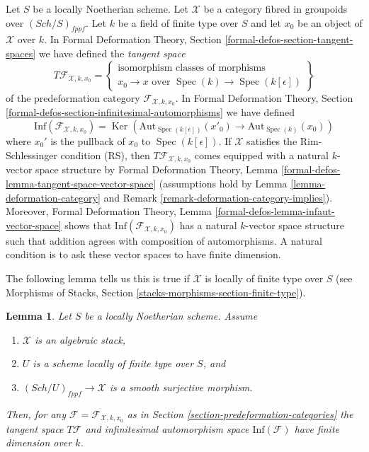\documentclass{stacks-project}
\theoremstyle{plain}
\newtheorem{lemma}[subsection]{Lemma}
\theoremstyle{definition}
\theoremstyle{remark}
\numberwithin{equation}{subsection}
\def\Spec{\mathop{\mathrm{Spec}}}
\def\Sch{\mathit{Sch}}
\def\Ker{\mathop{\mathrm{Ker}}}
\begin{document}
\noindent
Let $S$ be a locally Noetherian scheme. Let $\mathcal{X}$ be a category
fibred in groupoids over $(\Sch/S)_{fppf}$. Let $k$ be a field of finite
type over $S$ and let $x_0$ be an object of $\mathcal{X}$ over $k$.
In Formal Deformation Theory, Section \ref{formal-defos-section-tangent-spaces}
we have defined the {\it tangent space}
\begin{equation}
\label{equation-tangent-space}
T\mathcal{F}_{\mathcal{X}, k, x_0} =
\left\{
\begin{matrix}
\text{isomorphism classes of morphisms}\\
x_0 \to x\text{ over }\Spec(k) \to \Spec(k[\epsilon])
\end{matrix}
\right\}
\end{equation}
of the predeformation category $\mathcal{F}_{\mathcal{X}, k, x_0}$.
In Formal Deformation Theory, Section
\ref{formal-defos-section-infinitesimal-automorphisms}
we have defined
\begin{equation}
\label{equation-infinitesimal-automorphisms}
\text{Inf}(\mathcal{F}_{\mathcal{X}, k, x_0}) =
\Ker\left(
\text{Aut}_{\Spec(k[\epsilon])}(x'_0) \to \text{Aut}_{\Spec(k)}(x_0)
\right)
\end{equation}
where $x_0'$ is the pullback of $x_0$ to $\Spec(k[\epsilon])$.
If $\mathcal{X}$ satisfies the Rim-Schlessinger condition (RS), then
$T\mathcal{F}_{\mathcal{X}, k, x_0}$ comes equipped with a natural
$k$-vector space structure by Formal Deformation Theory, Lemma
\ref{formal-defos-lemma-tangent-space-vector-space}
(assumptions hold by Lemma \ref{lemma-deformation-category} and
Remark \ref{remark-deformation-category-implies}). Moreover,
Formal Deformation Theory, Lemma \ref{formal-defos-lemma-infaut-vector-space}
shows that $\text{Inf}(\mathcal{F}_{\mathcal{X}, k, x_0})$ has a
natural $k$-vector space structure such that addition agrees with
composition of automorphisms. A natural condition
is to ask these vector spaces to have finite dimension.

\medskip\noindent
The following lemma tells us this is true if
$\mathcal{X}$ is locally of finite type over $S$ (see
Morphisms of Stacks, Section \ref{stacks-morphisms-section-finite-type}).

\begin{lemma}
\label{lemma-finite-dimension}
Let $S$ be a locally Noetherian scheme. Assume
\begin{enumerate}
\item $\mathcal{X}$ is an algebraic stack,
\item $U$ is a scheme locally of finite type over $S$, and
\item $(\Sch/U)_{fppf} \to \mathcal{X}$ is a smooth surjective
morphism.
\end{enumerate}
Then, for any $\mathcal{F} = \mathcal{F}_{\mathcal{X}, k, x_0}$ as in
Section \ref{section-predeformation-categories}
the tangent space $T\mathcal{F}$ and infinitesimal automorphism space
$\text{Inf}(\mathcal{F})$ have finite dimension over $k$.
\end{lemma}
\end{document}
